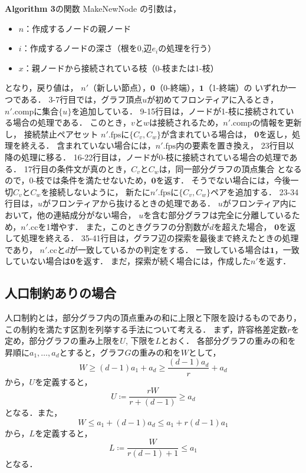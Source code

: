 \textbf{Algorithm 3}の関数 MakeNewNode の引数は，
\begin{itemize}
  \item $n$：作成するノードの親ノード
  \item $i$：作成するノードの深さ（根を0,辺$e_i$の処理を行う）
  \item $x$：親ノードから接続されている枝（0-枝または1-枝）
\end{itemize}
となり，戻り値は，
$n'$（新しい節点），$\textbf{0}$（0-終端），$\textbf{1}$（1-終端）の
いずれか一つである．
3-7行目では，グラフ頂点$u$が初めてフロンティアに入るとき，
$n'.\mathrm{comp}$に集合$\{u\}$を追加している．
9-15行目は，ノードが1-枝に接続されている場合の処理である．
このとき，$v$と$w$は接続されるため，$n'.\mathrm{comp}$の情報を更新し，
接続禁止ペアセット $n'.\mathrm{fps}$に$\{C_v,C_w\}$が含まれている場合は，
\textbf{0}を返し，処理を終える．
含まれていない場合には，$n'.\mathrm{fps}$内の要素を置き換え，
23行目以降の処理に移る．
16-22行目は，ノードが0-枝に接続されている場合の処理である．
17行目の条件文が真のとき，$C_v$と$C_w$は，同一部分グラフの頂点集合
となるので，0-枝では条件を満たせないため，$\textbf{0}$を返す．
そうでない場合には，今後一切$C_v$と$C_w$を接続しないように，
新たに$n'.\mathrm{fps}$に$\{C_v, C_w\}$ペアを追加する．
23-34行目は，$u$がフロンティアから抜けるときの処理である．
$u$がフロンティア内において，他の連結成分がない場合，
$u$を含む部分グラフは完全に分離しているため，$n'.\mathrm{cc}$を1増やす．
また，このときグラフの分割数が$d$を超えた場合，
$\textbf{0}$を返して処理を終える．
35-41行目は，グラフ辺の探索を最後まで終えたときの処理であり，
$n'.\mathrm{cc}$と$d$が一致しているかの判定をする．
一致している場合は$\textbf{1}$，一致していない場合は$\textbf{0}$を返す．
まだ，探索が続く場合には，作成した$n'$を返す．

\subsection{人口制約ありの場合}
人口制約とは，部分グラフ内の頂点重みの和に上限と下限を設けるものであり，
この制約を満たす区割を列挙する手法について考える．
まず，許容格差定数$r$を定め，部分グラフの重み上限を$U$, 下限を$L$とおく．
各部分グラフの重みの和を昇順に$a_1,\ldots,a_{d}$とすると，グラフ$G$の重みの和を$W$として，
$$ W \ge (d-1)a_1+a_{d} \ge \frac{(d-1)a_{d}}{r} + a_{d} $$
から，$U$を定義すると，
$$ U \coloneqq \frac{rW}{r+(d-1)} \ge	a_{d}$$
となる．また，
$$ W \le a_1+(d-1)a_{d} \le a_1+r(d-1)a_{1} $$
から，$L$を定義すると，
$$ L \coloneqq \frac{W}{r(d-1)+1} \le a_1 $$
となる．

